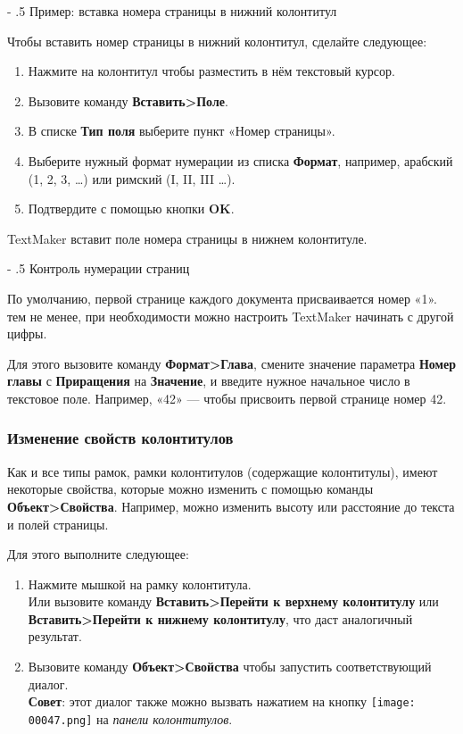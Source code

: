 ﻿\documentclass[a4paper,10pt]{article}
\makeatletter
\renewcommand\paragraph{%
   \@startsection{paragraph}{4}{0mm}%
      {-\baselineskip}%
      {.5\baselineskip}%
      {\normalfont\normalsize\bfseries}}
\makeatother
\begin{document}
\paragraph{Пример: вставка номера страницы в нижний колонтитул}

Чтобы вставить номер страницы в нижний колонтитул, сделайте следующее:
\begin{enumerate}
 \item Нажмите на колонтитул чтобы разместить в нём текстовый курсор.
 \item Вызовите команду \textbf{Вставить>Поле}.
 \item В списке \textbf{Тип поля} выберите пункт «Номер страницы».
 \item Выберите нужный формат нумерации из списка \textbf{Формат}, например, арабский (1, 2, 3, …) или римский (I, II, III …).
 \item Подтвердите с помощью кнопки \textbf{OK}.
\end{enumerate}

TextMaker вставит поле номера страницы в нижнем колонтитуле.

\paragraph{Контроль нумерации страниц}

По умолчанию, первой странице каждого документа присваивается номер «1». тем не менее, при необходимости можно настроить TextMaker начинать с другой цифры.

Для этого вызовите команду \textbf{Формат>Глава}, смените значение параметра \textbf{Номер главы} с \textbf{Приращения} на \textbf{Значение}, и введите нужное начальное число в текстовое поле. Например, «42» — чтобы присвоить первой странице номер 42.

\subsubsection{Изменение свойств колонтитулов} \label{sec:измсвойствколонтит}
Как и все типы рамок, рамки колонтитулов (содержащие колонтитулы), имеют некоторые свойства, которые можно изменить с помощью команды \textbf{Объект>Свойства}. Например, можно изменить высоту или расстояние до текста и полей страницы.

Для этого выполните следующее:

\begin{enumerate}
 \item Нажмите мышкой на рамку колонтитула.\\
 Или вызовите команду \textbf{Вставить>Перейти к верхнему колонтитулу} или \textbf{Вставить>Перейти к нижнему колонтитулу}, что даст аналогичный результат.
 \item Вызовите команду \textbf{Объект>Свойства} чтобы запустить соответствующий диалог.\\ 
 \textbf{Совет}: этот диалог также можно вызвать нажатием на кнопку \texttt{[image: 00047.png]} на \textit{панели колонтитулов}.
\end{enumerate}
\end{document}
